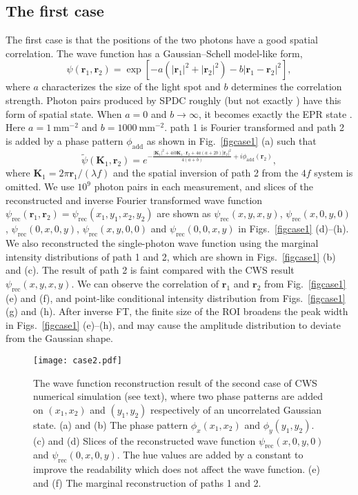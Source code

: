 \documentclass[pra,english,reprint,nofootinbib,aps,superscriptaddress,showpacs,showkeys]{revtex4-2}
\theoremstyle{definition}
\theoremstyle{remark}
\begin{document}
	\subsection{The first case}\label{sec3A}
	The first case is that the positions of the two photons have a good spatial correlation. The wave function has a Gaussian--Schell model-like form,
	\begin{equation}\label{corstate}
		\psi(\mathbf{r}_1,\mathbf{r}_2)=\exp\left[-a(|\mathbf{r}_1|^2+|\mathbf{r}_2|^2)-b|\mathbf{r}_1-\mathbf{r}_2|^2\right],
	\end{equation}
	where $a$ characterizes the size of the light spot and $b$ determines the correlation strength. Photon pairs produced by SPDC roughly (but not exactly \cite{corrreview}) have this form of spatial state. When $a=0$ and $b\rightarrow\infty$, it becomes exactly the EPR state \cite{EPR}. Here $a=1~\textrm{mm}^{-2}$ and $b=1000~\textrm{mm}^{-2}$. path 1 is Fourier transformed and path 2 is added by a phase pattern $\phi_\textrm{add}$ as shown in Fig.~\ref{figcase1} (a) such that
	\begin{equation}\label{corfft}
		\tilde{\psi}(\mathbf{K}_1,\mathbf{r}_2)=e^{-\frac{|\mathbf{K}_1|^2+4ib\mathbf{K}_1\cdot\mathbf{r}_2+4a(a+2b)|\mathbf{r}_2|^2}{4(a+b)}+i\phi_\textrm{add}(\mathbf{r}_2)},
	\end{equation}
	where $\mathbf{K}_1=2\pi\mathbf{r}_1/(\lambda f)$ and the spatial inversion of path 2 from the $4f$ system is omitted. We use $10^9$ photon pairs in each measurement, and slices of the reconstructed and inverse Fourier transformed wave function $\psi_\textrm{rec}(\mathbf{r}_1,\mathbf{r}_2)=\psi_\textrm{rec}(x_1,y_1,x_2,y_2)$ are shown as $\psi_\textrm{rec}(x,y,x,y)$, $\psi_\textrm{rec}(x,0,y,0)$, $\psi_\textrm{rec}(0,x,0,y)$, $\psi_\textrm{rec}(x,y,0,0)$ and $\psi_\textrm{rec}(0,0,x,y)$ in Figs.~\ref{figcase1} (d)--(h). We also reconstructed the single-photon wave function using the marginal intensity distributions of path 1 and 2, which are shown in Figs.~\ref{figcase1} (b) and (c). The result of path 2 is faint compared with the CWS result $\psi_\textrm{rec}(x,y,x,y)$. We can observe the correlation of $\mathbf{r}_1$ and $\mathbf{r}_2$ from Fig.~\ref{figcase1} (e) and (f), and point-like conditional intensity distribution from Figs.~\ref{figcase1} (g) and (h). After inverse FT, the finite size of the ROI broadens the peak width in Figs.~\ref{figcase1} (e)--(h), and may cause the amplitude distribution to deviate from the Gaussian shape.
	
	\begin{figure}[b]
		\centering
		\texttt{[image: case2.pdf]}
		\caption{The wave function reconstruction result of the second case of CWS numerical simulation (see text), where two phase patterns are added on $(x_1,x_2)$ and $(y_1,y_2)$ respectively of an uncorrelated Gaussian state. (a) and (b) The phase pattern $\phi_x(x_1,x_2)$ and $\phi_y(y_1,y_2)$. (c) and (d) Slices of the reconstructed wave function $\psi_\textrm{rec}(x,0,y,0)$ and $\psi_\textrm{rec}(0,x,0,y)$. The hue values are added by a constant to improve the readability which does not affect the wave function. (e) and (f) The marginal reconstruction of paths 1 and 2.
		}
		\label{figcase2}
	\end{figure}
	
\end{document}
